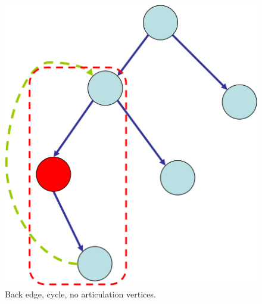 \begin{frame}
\begin{columns}
      \begin{column}{0.50\textwidth}
          \begin{figure}
            \begin{center}
              \includegraphics[scale=0.30]{figure/bfs_dfs/backedgebiconn}
              \caption{Back edge, cycle, no articulation vertices.}
              \label{fig:backedgebiconn}
            \end{center}
          \end{figure}
      \end{column}

    \end{columns}

\end{frame}


%
%
%
%


